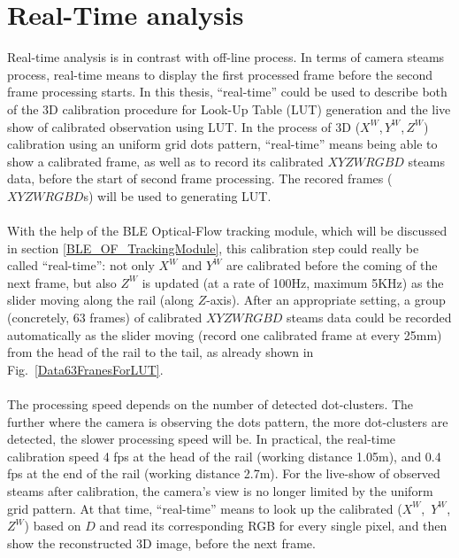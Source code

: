 \section{Real-Time analysis}
Real-time analysis is in contrast with off-line process. In terms of camera steams process, real-time means to display the first processed frame before the second frame processing starts. In this thesis, \enquote{real-time} could be used to describe both of the 3D calibration procedure for Look-Up Table (LUT) generation and the live show of calibrated observation using LUT.
In the process of 3D (\(X^{W}\),\,\(Y^{W}\),\,\(Z^{W}\)) calibration using an uniform grid dots pattern, \enquote{real-time} means being able to show a calibrated frame, as well as to record its calibrated \(XYZWRGBD\) steams data, before the start of second frame processing. The recored frames (\(XYZWRGBD\)s) will be used to generating LUT.%
\\\\%
With the help of the BLE Optical-Flow tracking module, which will be discussed in section \ref{BLE_OF_TrackingModule}, this calibration step could really be called \enquote{real-time}: not only \(X^{W}\) and \(Y^{W}\) are calibrated before the coming of the next frame, but also \(Z^{W}\) is updated (at a rate of 100Hz, maximum 5KHz) as the slider moving along the rail (along \(Z\)-axis). After an appropriate setting, a group (concretely, 63 frames) of calibrated \(XYZWRGBD\) steams data could be recorded automatically as the slider moving (record one calibrated frame at every 25mm) from the head of the rail to the tail, as already shown in Fig.~\ref{Data63FranesForLUT}.%
\\\\%
The processing speed depends on the number of detected dot-clusters. The further where the camera is observing the dots pattern, the more dot-clusters are detected, the slower processing speed will be. In practical, the real-time calibration speed 4 fps at the head of the rail (working distance 1.05m), and 0.4 fps at the end of the rail (working distance 2.7m).
%
%
For the live-show of observed steams after calibration, the camera's view is no longer limited by the uniform grid pattern. At that time, \enquote{real-time} means to look up the calibrated (\(X^{W}\),\, \(Y^{W}\),\, \(Z^{W}\)) based on \(D\) and read its corresponding RGB for every single pixel, and then show the reconstructed 3D image, before the next frame.%
